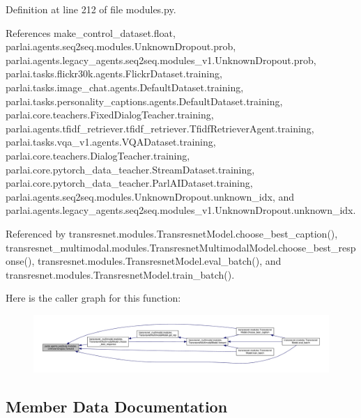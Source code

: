 Definition at line 212 of file modules.\+py.



References make\+\_\+control\+\_\+dataset.\+float, parlai.\+agents.\+seq2seq.\+modules.\+Unknown\+Dropout.\+prob, parlai.\+agents.\+legacy\+\_\+agents.\+seq2seq.\+modules\+\_\+v1.\+Unknown\+Dropout.\+prob, parlai.\+tasks.\+flickr30k.\+agents.\+Flickr\+Dataset.\+training, parlai.\+tasks.\+image\+\_\+chat.\+agents.\+Default\+Dataset.\+training, parlai.\+tasks.\+personality\+\_\+captions.\+agents.\+Default\+Dataset.\+training, parlai.\+core.\+teachers.\+Fixed\+Dialog\+Teacher.\+training, parlai.\+agents.\+tfidf\+\_\+retriever.\+tfidf\+\_\+retriever.\+Tfidf\+Retriever\+Agent.\+training, parlai.\+tasks.\+vqa\+\_\+v1.\+agents.\+V\+Q\+A\+Dataset.\+training, parlai.\+core.\+teachers.\+Dialog\+Teacher.\+training, parlai.\+core.\+pytorch\+\_\+data\+\_\+teacher.\+Stream\+Dataset.\+training, parlai.\+core.\+pytorch\+\_\+data\+\_\+teacher.\+Parl\+A\+I\+Dataset.\+training, parlai.\+agents.\+seq2seq.\+modules.\+Unknown\+Dropout.\+unknown\+\_\+idx, and parlai.\+agents.\+legacy\+\_\+agents.\+seq2seq.\+modules\+\_\+v1.\+Unknown\+Dropout.\+unknown\+\_\+idx.



Referenced by transresnet.\+modules.\+Transresnet\+Model.\+choose\+\_\+best\+\_\+caption(), transresnet\+\_\+multimodal.\+modules.\+Transresnet\+Multimodal\+Model.\+choose\+\_\+best\+\_\+response(), transresnet.\+modules.\+Transresnet\+Model.\+eval\+\_\+batch(), and transresnet.\+modules.\+Transresnet\+Model.\+train\+\_\+batch().

Here is the caller graph for this function\+:
\nopagebreak
\begin{figure}[H]
\begin{center}
\leavevmode
\includegraphics[width=350pt]{classparlai_1_1agents_1_1seq2seq_1_1modules_1_1UnknownDropout_ae0771638ed591c911178d94cd2bdc59d_icgraph}
\end{center}
\end{figure}


\subsection{Member Data Documentation}
\mbox{\label{classparlai_1_1agents_1_1seq2seq_1_1modules_1_1UnknownDropout_a1a265182c039545be63eb24c57bf3251}} 
